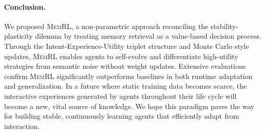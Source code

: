 \documentclass{article}
\theoremstyle{plain}
\theoremstyle{definition}
\theoremstyle{remark}
\begin{document}
\paragraph{Conclusion.}
We proposed \textsc{MemRL}, a non-parametric approach reconciling the stability-plasticity dilemma by treating memory retrieval as a value-based decision process. Through the Intent-Experience-Utility triplet structure and Monte Carlo style updates, \textsc{MemRL} enables agents to self-evolve and differentiate high-utility strategies from semantic noise without weight updates. Extensive evaluations confirm \textsc{MemRL} significantly outperforms baselines in both runtime adaptation and generalization. In a future where static training data becomes scarce, the interactive experiences generated by agents throughout their life cycle will become a new, vital source of knowledge. We hope this paradigm paves the way for building stable, continuously learning agents that efficiently adapt from interaction.


\end{document}
